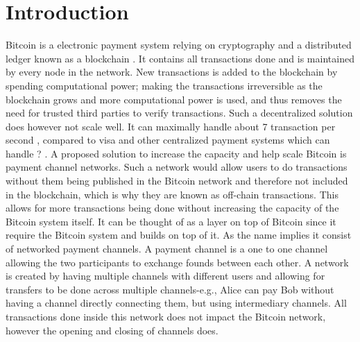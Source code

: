 \chapter{Introduction}
\label{chap:introduction}

Bitcoin is a electronic payment system relying on cryptography and a distributed ledger known as a blockchain \cite{nakamoto2008}. 
It contains all transactions done and is maintained by every node in the network. New transactions is added to the blockchain by spending computational power; making the transactions irreversible as the blockchain grows and more computational power is used, and thus removes the need for trusted third parties to verify transactions. Such a decentralized solution does however not scale well. It can maximally handle about 7 transaction per second , compared to visa and other centralized payment systems which can handle ? .
A proposed solution to increase the capacity and help scale Bitcoin is payment channel networks. Such a network would allow users to do  transactions without them being published in the Bitcoin network and therefore not included in the blockchain, which is why they are known as off-chain transactions. This allows for more transactions being done without increasing the capacity of the Bitcoin system itself. It can be thought of as a layer on top of Bitcoin since it require the Bitcoin system and builds on top of it. As the name implies it consist of networked payment channels. A payment channel is a one to one channel allowing the two participants to exchange founds between each other. A network is created by having multiple channels with different users and allowing for transfers to be done across multiple channels-e.g., Alice can pay Bob without having a channel directly connecting them, but using intermediary channels. All transactions done inside this network does not impact the Bitcoin network, however the opening and closing of channels does.
\\ 


